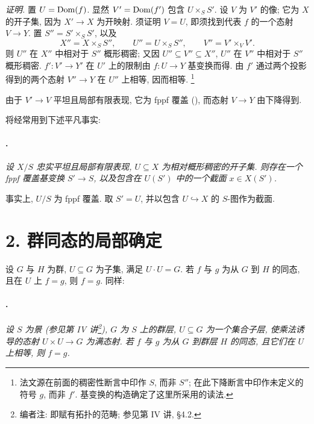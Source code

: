 \textit{证明.}
置 \(U=\operatorname{Dom}(f)\). 显然 \(V'=\operatorname{Dom}(f')\) 包含 \(U\times_S S'\).
设 \(V\) 为 \(V'\) 的像; 它为 \(X\) 的开子集, 因为 \(X'\to X\) 为开映射.
须证明 \(V=U\), 即须找到代表 \(f\) 的一个态射 \(V\to Y\).
置 \(S''=S'\times_S S'\), 以及
\[
  X''=X\times_S S'',\qquad
  U''=U\times_S S'',\qquad
  V''=V'\times_V V'.
\]
则 \(U''\) 在 \(X''\) 中相对于 \(S''\) 概形稠密;
又因 \(U''\subseteq V''\subseteq X''\), \(U''\) 在 \(V''\) 中相对于 \(S''\) 概形稠密.
\(f':V'\to Y'\) 在 \(U'\) 上的限制由 \(f:U\to Y\) 基变换而得.
由 \(f'\) 通过两个投影得到的两个态射 \(V''\to Y\)
在 \(U''\) 上相等, 因而相等.\begingroup
\renewcommand{\thefootnote}{\ensuremath{\dagger}}\footnote{法文源在前面的稠密性断言中印作 \(S\),
而非 \(S''\); 在此下降断言中印作未定义的符号 \(g\), 而非 \(f'\).
基变换的构造确定了这里所采用的读法.}
\addtocounter{footnote}{-1}
\endgroup
由于 \(V'\to V\) 平坦且局部有限表现, 它为 fppf 覆盖
(), 而态射 \(V\to Y\) 由下降得到.

将经常用到下述平凡事实:

\paragraph{.}
\textit{设 \(X/S\) 忠实平坦且局部有限表现,
\(U\subseteq X\) 为相对概形稠密的开子集.
则存在一个 fppf 覆盖基变换 \(S'\to S\),
以及包含在 \(U(S')\) 中的一个截面 \(x\in X(S')\).}

事实上, \(U/S\) 为 fppf 覆盖.
取 \(S'=U\), 并以包含 \(U\hookrightarrow X\) 的 \(S\)-图作为截面.

\section*{2. 群同态的局部确定}

设 \(G\) 与 \(H\) 为群, \(U\subseteq G\) 为子集, 满足 \(U\cdot U=G\).
若 \(f\) 与 \(g\) 为从 \(G\) 到 \(H\) 的同态, 且在 \(U\) 上 \(f=g\), 则 \(f=g\).
同样:

\paragraph{.}
\textit{设 \(S\) 为景 (参见第 IV 讲\footnote{编者注: 即赋有拓扑的范畴;
参见第 IV 讲, \S4.2.}), \(G\) 为 \(S\) 上的群层,
\(U\subseteq G\) 为一个集合子层, 使乘法诱导的态射 \(U\times U\to G\) 为满态射.
若 \(f\) 与 \(g\) 为从 \(G\) 到群层 \(H\) 的同态,
且它们在 \(U\) 上相等, 则 \(f=g\).}

